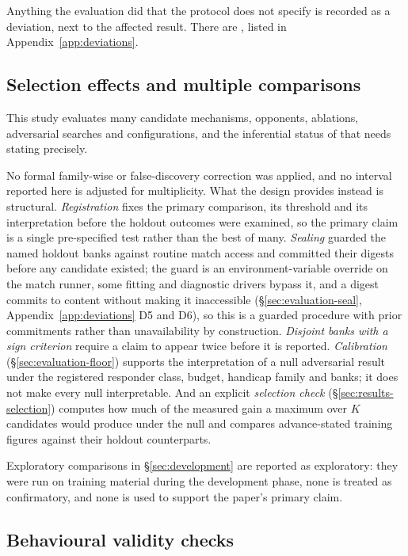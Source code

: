 Anything the evaluation did that the protocol does not specify is recorded as a deviation, next to
the affected result. There are \vsevenDeviations{}, listed in Appendix~\ref{app:deviations}.

\subsection{Selection effects and multiple comparisons}
\label{sec:evaluation-multiplicity}

This study evaluates many candidate mechanisms, opponents, ablations, adversarial searches and
configurations, and the inferential status of that needs stating precisely.

No formal family-wise or false-discovery correction was applied, and no interval reported
here is adjusted for multiplicity. What the design provides instead is structural.
\emph{Registration} fixes the primary comparison, its threshold and its interpretation before the
holdout outcomes were examined, so the primary claim is a single pre-specified test rather than the
best of many.
\emph{Sealing} guarded the named holdout banks against routine match access and committed their
digests before any candidate existed; the guard is an environment-variable override on the match
runner, some fitting and diagnostic drivers bypass it, and a digest commits to content without
making it inaccessible (\S\ref{sec:evaluation-seal}, Appendix~\ref{app:deviations} D5 and D6), so
this is a guarded procedure with prior commitments rather than unavailability by construction. \emph{Disjoint banks with a sign criterion} require a claim to appear twice
before it is reported. \emph{Calibration} (\S\ref{sec:evaluation-floor}) supports the interpretation of a null
adversarial result under the registered responder class, budget, handicap family and banks; it does
not make every null interpretable. And an explicit
\emph{selection check} (\S\ref{sec:results-selection}) computes how much of the measured gain a
maximum over $K$ candidates would produce under the null and compares advance-stated training figures
against their holdout counterparts.

Exploratory comparisons in \S\ref{sec:development} are reported as exploratory: they were run on
training material during the development phase, none is treated as confirmatory, and none is used to
support the paper's primary claim.

\subsection{Behavioural validity checks}
\label{sec:evaluation-gate}


